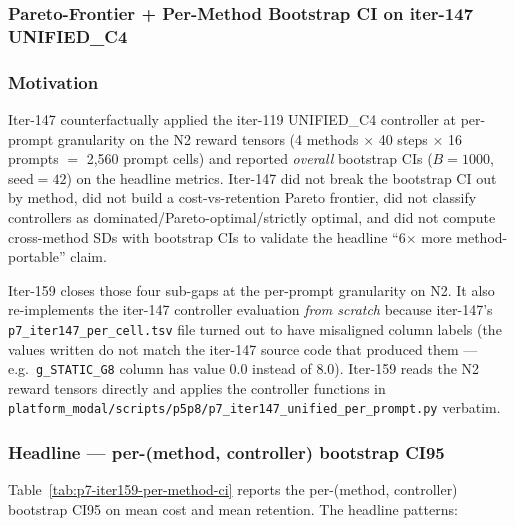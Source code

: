 
\subsubsection*{Pareto-Frontier + Per-Method Bootstrap CI on iter-147 UNIFIED\_C4}
\label{sec:p7-iter159-pareto}

\subsubsection*{Motivation}

Iter-147 counterfactually applied the iter-119 UNIFIED\_C4 controller at per-prompt
granularity on the N2 reward tensors (4 methods $\times$ 40 steps $\times$ 16 prompts $=$
2,560 prompt cells) and reported \emph{overall} bootstrap CIs
($B=1000$, seed$=42$) on the headline metrics. Iter-147 did not break the
bootstrap CI out by method, did not build a cost-vs-retention Pareto
frontier, did not classify controllers as dominated/Pareto-optimal/strictly
optimal, and did not compute cross-method SDs with bootstrap CIs to
validate the headline ``6$\times$ more method-portable'' claim.

Iter-159 closes those four sub-gaps at the per-prompt granularity on N2.
It also re-implements the iter-147 controller evaluation \emph{from scratch}
because iter-147's \texttt{p7\_iter147\_per\_cell.tsv} file turned out to
have misaligned column labels (the values written do not match the iter-147
source code that produced them --- e.g.\ \texttt{g\_STATIC\_G8} column has
value $0.0$ instead of $8.0$). Iter-159 reads the N2 reward tensors
directly and applies the controller functions in
\texttt{platform_modal/scripts/p5p8/p7\_iter147\_unified\_per\_prompt.py} verbatim.

\subsubsection*{Headline --- per-(method, controller) bootstrap CI95}

Table~\ref{tab:p7-iter159-per-method-ci} reports the per-(method, controller)
bootstrap CI95 on mean cost and mean retention. The headline patterns:

